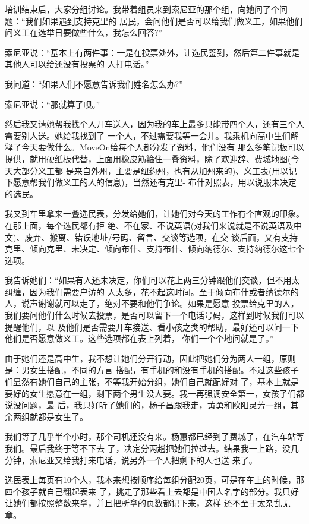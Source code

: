 ﻿\documentclass[11pt]{article}
\begin{document}
培训结束后，大家分组讨论。我带着组员来到索尼亚的那个组，向她问了个问题：``我们如果遇到支持克里的
居民，会问他们是否可以给我们做义工，如果他们问义工在选举日要做些什么，我怎么回答?''

索尼亚说：``基本上有两件事：一是在投票处外，让选民签到，然后第二件事就是其他人可以给还没有投票的
人打电话。''

我问道：``如果人们不愿意告诉我们姓名怎么办?''

索尼亚说：``那就算了呗。''

然后我又请她帮我找个人开车送人，因为我的车上最多只能带四个人，还有三个人需要别人送。她给我找到了
一个人，不过需要我等一会儿。我乘机向高中生们解释了今天要做什么。MoveOn给每个人都分发了资料，他们没有
那么多笔记板可以提供，就用硬纸板代替，上面用橡皮筋箍住一叠资料，除了欢迎辞、费城地图(今天大部分义工都
是来自外州，主要是纽约州，也有从加州来的)、义工表(用以记下愿意帮我们做义工的人的信息)，当然还有克里-
布什对照表，用以说服未决定的选民。

我又到车里拿来一叠选民表，分发给她们，让她们对今天的工作有个直观的印象。在那上面，每个选民都有拒
绝、不在家、不说英语(对我们来说就是不说英语及中文)、废弃、搬离、错误地址/号码、留言、交谈等选项，在交
谈后面，又有支持克里、倾向克里、未决定、倾向布什、支持布什、倾向纳德尔、支持纳德尔这七个选项。

我告诉她们：``如果有人还未决定，你们可以花上两三分钟跟他们交谈，但不用太纠缠，因为我们需要户访的
人太多，花不起这时间。至于倾向布什或者纳德尔的人，说声谢谢就可以走了，绝对不要和他们争论。如果是愿意
投票给克里的人，我们要问他们什么时候去投票，是否可以留下一个电话号码，这样到时候我们可以提醒他们，以
及他们是否需要开车接送、看小孩之类的帮助，最好还可以问一下他们是否愿意做义工。这些选项都在表上列着，
你们一个个地问就是了。''

由于她们还是高中生，我不想让她们分开行动，因此把她们分为两人一组，原则是：男女生搭配，不同的方言
搭配，有手机的和没有手机的搭配。不过这些孩子们显然有她们自己的主张，不等我开始分组，她们自己就配好对
了，基本上就是要好的女生愿意在一组，剩下两个男生没人要。我一再强调安全第一，女孩子们都说没问题，最
后，我只好听了她们的，杨子昌跟我走，黄勇和欧阳灵芳一组，其余两组就都是女生了。


我们等了几乎半个小时，那个司机还没有来。杨蕙都已经到了费城了，在汽车站等我们。最后我终于等不下去
了，决定分两趟把她们拉过去。结果我一上路，没几分钟，索尼亚又给我打来电话，说另外一个人把剩下的人也送
来了。

选民表上每页有10个人，我本来想按顺序给每组分配20页，可是在车上的时候，那四个孩子就自己翻起表来
了，挑走了那些看上去都是中国人名字的部分。我只好让她们都按照整数来拿，并且把所拿的页数都记下来，这样
还不至于太杂乱无章。
\end{document}
